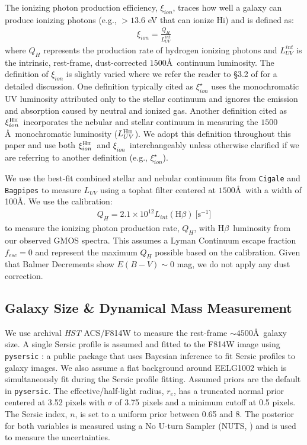 \documentclass[twocolumn,tight,times,linenumbers]{aastex631}
\newcommand{\hbeta}{H$\beta$}
\newcommand{\xiion}{$\xi_{ion}$}
\newcommand{\xiionHtwo}{$\xi_{ion}^\textrm{H{\sc ii}}$}
\begin{document}
	The ionizing photon production efficiency, \xiion, traces how well a galaxy can produce ionizing photons (e.g., $> 13.6$ eV that can ionize H{\sc i}) and is defined as:
	\begin{eqnarray}
		\textrm{\xiion} = \frac{Q_H}{L_{UV}^{int}}
		\label{eqn:xiion}
	\end{eqnarray}
	where $Q_H$ represents the production rate of hydrogen ionizing photons and $L_{UV}^{int}$ is the intrinsic, rest-frame, dust-corrected $1500$\AA~continuum luminosity. The definition of $\xi_{ion}$ is slightly varied where we refer the reader to \S3.2 of \cite{Chevallard2018} for a detailed discussion. One definition typically cited as $\xi_{ion}^\star$ uses the monochromatic UV luminosity attributed only to the stellar continuum and ignores the emission and absorption caused by neutral and ionized gas. Another definition cited as \xiionHtwo~incorporates the nebular and stellar continuum in measuring the $1500$\AA~monochromatic luminosity ($L_{UV}^\textrm{H{\sc ii}}$). We adopt this definition throughout this paper and use both \xiionHtwo~and \xiion~interchangeably unless otherwise clarified if we are referring to another definition (e.g., $\xi_{ion}^\star$).
	
	We use the best-fit combined stellar and nebular continuum fits from \texttt{Cigale} and \texttt{Bagpipes} to measure $L_{UV}$ using a tophat filter centered at $1500$\AA~with a width of 100\AA. We use the \cite{Leitherer1995} calibration:
	\begin{eqnarray}
		Q_H = 2.1\times10^{12} L_{int}(\textrm{H}\beta)~\textrm{[s$^{-1}$]}
	\end{eqnarray}
	to measure the ionizing photon production rate, $Q_H$, with \hbeta~luminosity from our observed GMOS spectra. This assumes a Lyman Continuum escape fraction $f_{esc} = 0$ and represent the maximum $Q_H$ possible based on the calibration. Given that Balmer Decrements show $E(B-V) \sim 0$ mag, we do not apply any dust correction.

	\subsection{Galaxy Size \& Dynamical Mass Measurement}
	\label{sec:dynamical_mass}
	
	We use archival \textit{HST} ACS/F814W to measure the rest-frame $\sim 4500$\AA~galaxy size. A single Sersic profile is assumed and fitted to the F814W image using \texttt{pysersic} \citep{Pasha2023}: a public package that uses Bayesian inference to fit Sersic profiles to galaxy images. We also assume a flat background around EELG1002 which is simultaneously fit during the Sersic profile fitting. Assumed priors are the default in \texttt{pysersic}. The effective/half-light radius, $r_{e}$, has a truncated normal prior centered at 3.52 pixels with $\sigma$ of 3.75 pixels and a minimum cutoff at 0.5 pixels. The Sersic index, $n$, is set to a uniform prior between 0.65 and 8. The posterior for both variables is measured using a No U-turn Sampler (NUTS, \citealt{Hoffman2014}) and is used to measure the uncertainties.
	
\end{document}

